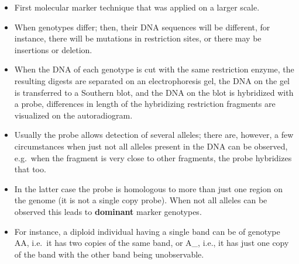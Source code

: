 \documentclass[11pt,dvipsnames,ignorenonframetext,aspectratio=169]{beamer}
\providecommand{\tightlist}{%
  \setlength{\itemsep}{0pt}\setlength{\parskip}{0pt}}
\begin{document}
\begin{frame}{}
\protect\hypertarget{section-14}{}

\begin{itemize}
\tightlist
\item
  First molecular marker technique that was applied on a larger scale.
\item
  When genotypes differ; then, their DNA sequences will be different,
  for instance, there will be mutations in restriction sites, or there
  may be insertions or deletion.
\item
  When the DNA of each genotype is cut with the same restriction enzyme,
  the resulting digests are separated on an electrophoresis gel, the DNA
  on the gel is transferred to a Southern blot, and the DNA on the blot
  is hybridized with a probe, differences in length of the hybridizing
  restriction fragments are visualized on the autoradiogram.
\end{itemize}

\end{frame}

\begin{frame}{}
\protect\hypertarget{section-15}{}

\begin{itemize}
\tightlist
\item
  Usually the probe allows detection of several alleles; there are,
  however, a few circumstances when just not all alleles present in the
  DNA can be observed, e.g.~when the fragment is very close to other
  fragments, the probe hybridizes that too.
\item
  In the latter case the probe is homologous to more than just one
  region on the genome (it is not a single copy probe). When not all
  alleles can be observed this leads to \textbf{dominant} marker
  genotypes.
\item
  For instance, a diploid individual having a single band can be of
  genotype AA, i.e.~it has two copies of the same band, or A\_, i.e., it
  has just one copy of the band with the other band being unobservable.
\end{itemize}

\end{frame}
\end{document}
